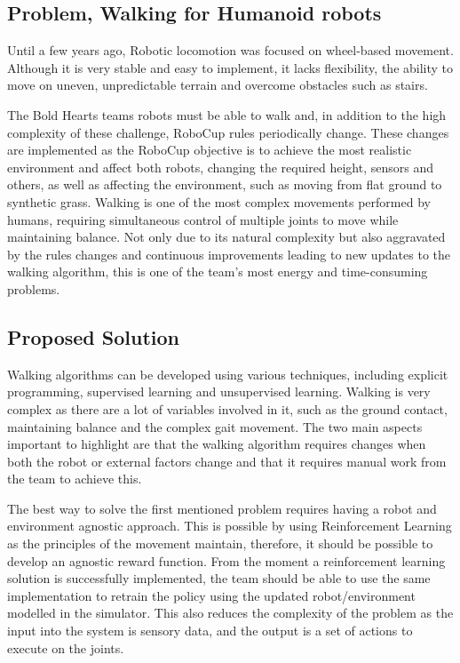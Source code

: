  \subsection{Problem, Walking for Humanoid robots}
 Until a few years ago, Robotic locomotion was focused on wheel-based movement. Although it is very stable and easy to implement, it lacks flexibility, the ability to move on uneven, unpredictable terrain and overcome obstacles such as stairs.

 The Bold Hearts teams robots must be able to walk and, in addition to the high complexity of these challenge, RoboCup rules periodically change. 
 These changes are implemented as the RoboCup objective is to achieve the most realistic environment and affect both robots, changing the required height, sensors and others, as well as affecting the environment, 
 such as moving from flat ground to synthetic grass. Walking is one of the most complex movements performed by humans, requiring simultaneous control of multiple joints to move while maintaining balance. 
 Not only due to its natural complexity but also aggravated by the rules changes and continuous improvements leading to new updates to the walking algorithm, this is one of the team's most energy and time-consuming problems.
 \subsection{Proposed Solution}

 Walking algorithms can be developed using various techniques, 
 including explicit programming, supervised learning and unsupervised learning. 
 Walking is very complex as there are a lot of variables involved in it, such as the ground contact, 
 maintaining balance and the complex gait movement. The two main aspects important to highlight are that the walking algorithm requires changes when both the robot or external factors change and that it requires manual work from the team to achieve this. 

 The best way to solve the first mentioned problem requires having a robot and environment agnostic approach. This is possible by using Reinforcement Learning as the principles of the movement maintain, therefore, it should be possible to develop an agnostic reward function.
 From the moment a reinforcement learning solution is successfully implemented, the team should be able to use the same implementation to retrain the policy using the updated robot/environment modelled in the simulator.
 This also reduces the complexity of the problem as the input into the system is sensory data, and the output is a set of actions to execute on the joints.

